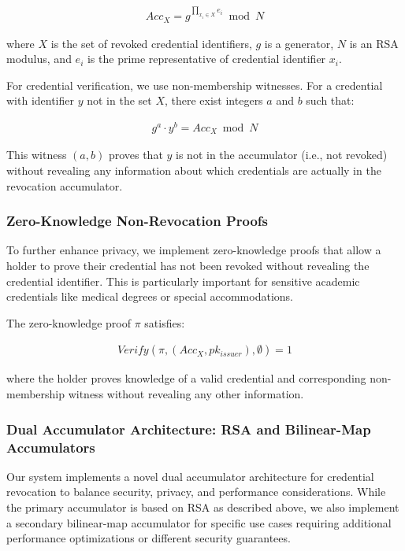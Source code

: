 \documentclass[lettersize,journal]{IEEEtran}
\begin{document}
\begin{itemize}
\begin{align}
    Acc_{X} = g^{\prod_{x_i \in X} e_i} \bmod N
\end{align}

where $X$ is the set of revoked credential identifiers, $g$ is a generator, $N$ is an RSA modulus, and $e_i$ is the prime representative of credential identifier $x_i$.

For credential verification, we use non-membership witnesses. For a credential with identifier $y$ not in the set $X$, there exist integers $a$ and $b$ such that:

\begin{align}
    g^a \cdot y^b = Acc_{X} \bmod N
\end{align}

This witness $(a,b)$ proves that $y$ is not in the accumulator (i.e., not revoked) without revealing any information about which credentials are actually in the revocation accumulator.

\subsubsection{Zero-Knowledge Non-Revocation Proofs}
To further enhance privacy, we implement zero-knowledge proofs \cite{ZKP2023} that allow a holder to prove their credential has not been revoked without revealing the credential identifier. This is particularly important for sensitive academic credentials like medical degrees or special accommodations.

The zero-knowledge proof $\pi$ satisfies:

\begin{align}
    Verify(\pi, (Acc_X, pk_{issuer}), \emptyset) = 1
\end{align}

where the holder proves knowledge of a valid credential and corresponding non-membership witness without revealing any other information.

\subsubsection{Dual Accumulator Architecture: RSA and Bilinear-Map Accumulators}

Our system implements a novel dual accumulator architecture for credential revocation to balance security, privacy, and performance considerations. While the primary accumulator is based on RSA as described above, we also implement a secondary bilinear-map accumulator for specific use cases requiring additional performance optimizations or different security guarantees.


\end{itemize}
\end{document}
